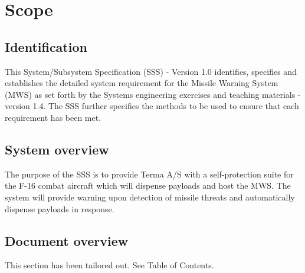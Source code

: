 \documentclass[Main]{subfiles}
\begin{document}
\chapter{Scope}

\section{Identification}
This System/Subsystem Specification (SSS) - Version 1.0 identifies, specifies and establishes the detailed system requirement for the Missile Warning System (MWS) as set forth by the Systems engineering exercises and teaching materials - version 1.4.
The SSS further specifies the methods to be used to ensure that each requirement has been met. 

\section{System overview}
The purpose of the SSS is to provide Terma A/S with a self-protection suite for the F-16 combat aircraft which will dispense payloads and host the MWS. 
The system will provide warning upon detection of missile threats and automatically dispense payloads in response.

\section{Document overview}
This section has been tailored out. See Table of Contents.
\end{document}
